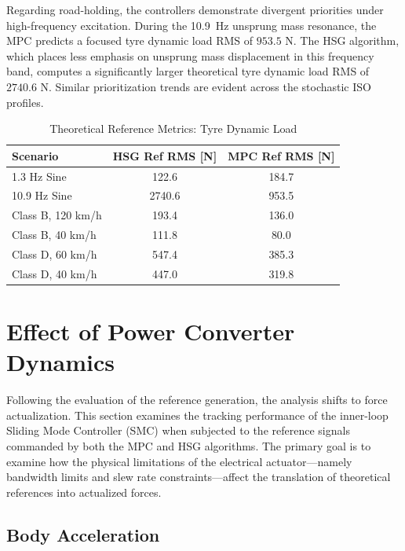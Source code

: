 Regarding road-holding, the controllers demonstrate divergent priorities under high-frequency excitation. During the 10.9~Hz unsprung mass resonance, the MPC predicts a focused tyre dynamic load RMS of $953.5\text{ N}$. The HSG algorithm, which places less emphasis on unsprung mass displacement in this frequency band, computes a significantly larger theoretical tyre dynamic load RMS of $2740.6\text{ N}$. Similar prioritization trends are evident across the stochastic ISO profiles.

\begin{table}[H]
    \centering
    \caption{Theoretical Reference Metrics: Tyre Dynamic Load}
    \label{tab:ref_rh_metrics}
    \renewcommand{\arraystretch}{1.2}
    \begin{tabular}{lcc}
        \toprule
        \textbf{Scenario} & \textbf{HSG Ref RMS} [N] & \textbf{MPC Ref RMS} [N] \\
        \midrule
        1.3 Hz Sine      & 122.6 & 184.7 \\
        10.9 Hz Sine     & 2740.6 & 953.5 \\
        Class B, 120 km/h & 193.4 & 136.0 \\
        Class B, 40 km/h  & 111.8 & 80.0 \\
        Class D, 60 km/h  & 547.4 & 385.3 \\
        Class D, 40 km/h  & 447.0 & 319.8 \\
        \bottomrule
    \end{tabular}
\end{table}

\section{Effect of Power Converter Dynamics}
Following the evaluation of the reference generation, the analysis shifts to force actualization. This section examines the tracking performance of the inner-loop Sliding Mode Controller (SMC) when subjected to the reference signals commanded by both the MPC and HSG algorithms. The primary goal is to examine how the physical limitations of the electrical actuator—namely bandwidth limits and slew rate constraints—affect the translation of theoretical references into actualized forces.

\subsection{Body Acceleration}

